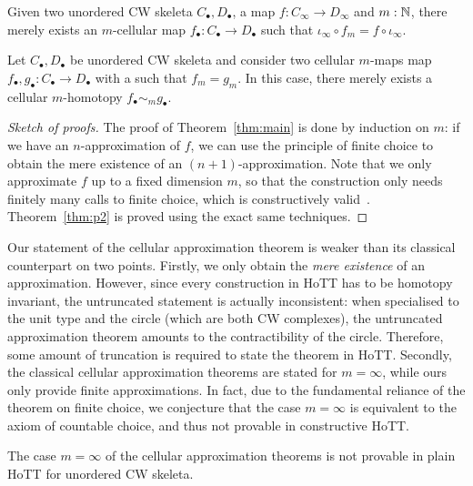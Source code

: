 \documentclass{easychair}
\begin{document}
\begin{theorem}\label{thm:main}
  Given two unordered CW skeleta $C_\bullet,D_\bullet$, a map $f : C_\infty \to  D_\infty$ and
  $m:\mathbb{N}$, there merely exists an $m$-cellular map $f_\bullet : C_\bullet \to D_{\bullet}$ such that
  $\iota_{\infty} \circ f_m = f \circ \iota_{\infty}$.
\end{theorem}

\begin{theorem}\label{thm:p2}
  Let $C_\bullet,D_\bullet$ be unordered CW skeleta and consider two
  cellular $m$-maps map $f_\bullet,g_\bullet : C_\bullet \to D_\bullet$ with a
  such that $f_m = g_m$. In this case, there merely exists a
  cellular $m$-homotopy $f_\bullet \sim_m g_\bullet$.
\end{theorem}

\begin{proof}[Sketch of proofs]
The proof of Theorem~\ref{thm:main} is done by induction on \( m \):
%
if we have an \( n \)-approximation of \( f \), we can use the principle of finite choice to obtain
the mere existence of an \( (n+1) \)-approximation.
%
Note that we only approximate \( f \) up to a fixed dimension \( m \), so that the construction
only needs finitely many calls to finite choice, which is constructively valid~\cite[exercise 3.22]{HoTT13}.
%
Theorem~\ref{thm:p2} is proved using the exact same techniques.
\end{proof}

Our statement of the cellular approximation theorem is weaker than its classical counterpart on two
points.
%
Firstly, we only obtain the \emph{mere existence} of an approximation. However, since every
construction in HoTT has to be homotopy invariant, the untruncated statement is actually
inconsistent: when specialised to the unit type and the circle (which are both CW complexes),
the untruncated approximation theorem amounts to the contractibility of the circle.
Therefore, some amount of truncation is required to state the theorem in HoTT.
%
Secondly, the classical cellular approximation theorems are stated for \( m = \infty \), while
ours only provide finite approximations.
%
In fact, due to the fundamental reliance of the theorem on finite choice, we conjecture that the
case \( m = \infty \) is equivalent to the axiom of countable choice, and thus not provable in
constructive HoTT.

\begin{conjecture}
  The case \( m = \infty \) of the cellular approximation theorems is not provable in plain HoTT
  for unordered CW skeleta.
\end{conjecture}
\end{document}
